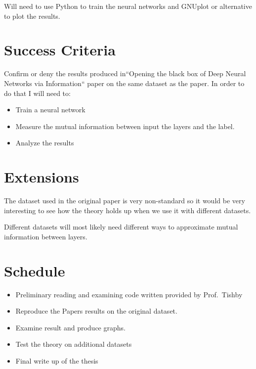 \documentclass[12pt]{article}
\begin{document}
Will need to use Python to train the neural networks and GNUplot or alternative
to plot the results.

\section*{Success Criteria}

Confirm or deny the results produced in``Opening the black box of Deep Neural
Networks via Information`` paper on the same dataset as the paper. In order to do
that I will need to:

\begin{itemize}
  \item Train a neural network
  \item Measure the mutual information between input the layers and the label.
  \item Analyze the results
\end{itemize}

\section*{Extensions}

The dataset used in the original paper is very non-standard so it would be very
interesting to see how the theory holds up when we use it with different
datasets.

Different datasets will most likely need different ways to approximate mutual
information between layers.

\section*{Schedule}




\begin{itemize}
  \item {

      Preliminary reading and examining code written provided by Prof.\ Tishby
  } \item {

      Reproduce the Papers results on the original dataset.
  } \item {

      Examine result and produce graphs.
  } \item {

      Test the theory on additional datasets 
  } \item {

      Final write up of the thesis
  }
\end{itemize}
\end{document}
